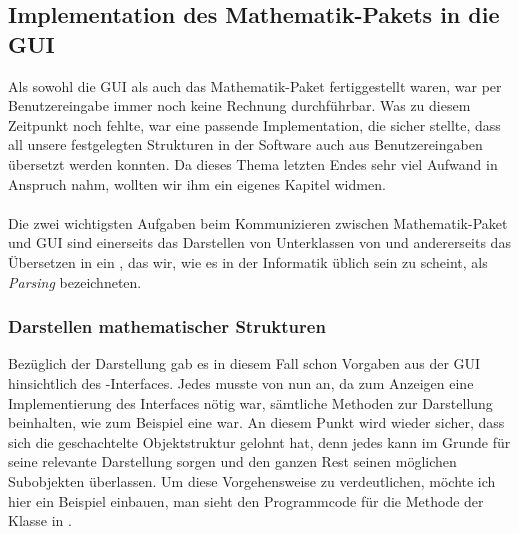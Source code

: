 \subsection{Implementation des Mathematik-Pakets in die GUI}
Als sowohl die GUI als auch das Mathematik-Paket fertiggestellt waren, war per Benutzereingabe immer noch keine Rechnung durchführbar. Was zu diesem Zeitpunkt noch fehlte, war eine passende Implementation, die sicher stellte, dass all unsere festgelegten Strukturen in der Software auch aus Benutzereingaben übersetzt werden konnten. Da dieses Thema letzten Endes sehr viel Aufwand in Anspruch nahm, wollten wir ihm ein eigenes Kapitel widmen.\\
\\
Die zwei wichtigsten Aufgaben beim Kommunizieren zwischen Mathematik-Paket und GUI sind einerseits das Darstellen von Unterklassen von  und andererseits das Übersetzen in ein , das wir, wie es in der Informatik üblich sein zu scheint, als \textit{Parsing} bezeichneten.

\subsubsection{Darstellen mathematischer Strukturen}
Bezüglich der Darstellung gab es in diesem Fall schon Vorgaben aus der GUI hinsichtlich des -Interfaces. Jedes  musste von nun an, da zum Anzeigen eine Implementierung des Interfaces nötig war, sämtliche Methoden zur Darstellung beinhalten, wie zum Beispiel  eine war. An diesem Punkt wird wieder sicher, dass sich die geschachtelte Objektstruktur gelohnt hat, denn jedes  kann im Grunde für seine relevante Darstellung sorgen und den ganzen Rest seinen möglichen Subobjekten überlassen. Um diese Vorgehensweise zu verdeutlichen, möchte ich hier ein Beispiel einbauen, man sieht den Programmcode für die Methode der Klasse in .\\


